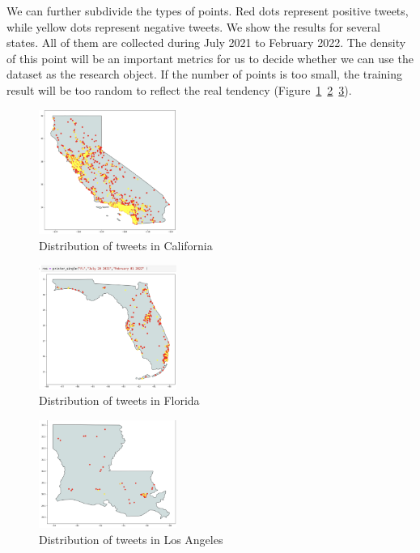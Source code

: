 We can further subdivide the types of points. Red dots represent positive
tweets, while yellow dots represent negative tweets. We show the results for
several states. All of them are collected during July 2021 to February 2022.
The density of this point will be an important metrics for us to decide
whether we can use the dataset as the research object. If the number of
points is too small, the training result will be too random to reflect the
real tendency (Figure~\ref{fig:Distribution of tweets}~\ref{fig:Distribution of tweets in Florida}~\ref{fig:Distribution in Los Angeles}). 
\begin{figure}[h]
    \centering
    \includegraphics[width=0.4\textwidth]{imgs/CA.png}
    \caption{\label{fig:Distribution of tweets}Distribution of tweets in California}
\end{figure}
\begin{figure}[h]
    \centering
    \includegraphics[width=0.4\textwidth]{imgs/FL.png}
    \caption{\label{fig:Distribution of tweets in Florida}Distribution of tweets in Florida}
\end{figure}
\begin{figure}[h]
    \centering
    \includegraphics[width=0.4\textwidth]{imgs/LA.png}
    \caption{Distribution of tweets in Los Angeles}
    \label{fig:Distribution in Los Angeles}
\end{figure}
